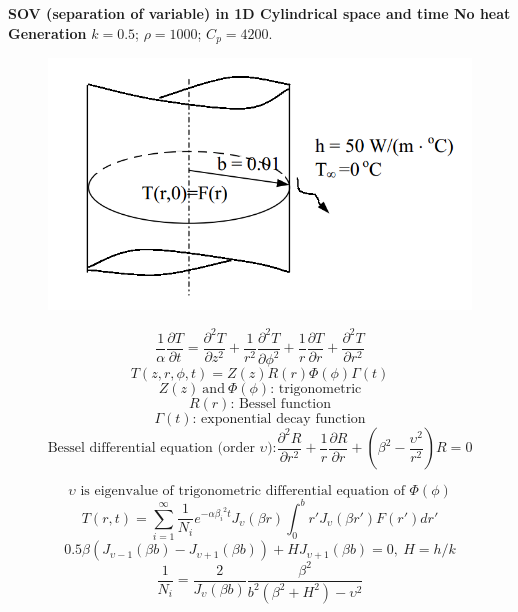 \begin{example}
\textbf{SOV (separation of variable) in 1D Cylindrical space and time
No heat Generation}
$k = 0.5$; $\rho= 1000$; $C_p = 4200$.
\begin{figure}[H]
  \centering
    \includegraphics[scale=0.5]{figures/appendixA/6}
\end{figure}
$$\frac{1}{\alpha}\frac{\partial T}{\partial t}=
\frac{\partial^2 T}{\partial z^2}+
\frac{1}{r^2}\frac{\partial^2 T}{\partial \phi^2}+
\frac{1}{r}\frac{\partial T}{\partial r}+
\frac{\partial^2 T}{\partial r^2}$$
$$T(z,r,\phi,t)=Z(z)R(r)\Phi(\phi)\Gamma(t)$$
$$Z(z)~\text{and} ~\Phi(\phi)\text{: trigonometric}$$
$$R(r)\text{: Bessel function}$$
$$\Gamma(t)\text{: exponential decay function}$$
$$\text{Bessel differential equation (order } \upsilon\text{):}
\frac{\partial^2 R}{\partial r^2}+
\frac{1}{r}\frac{\partial R}{\partial r}+
\left(\beta^2-\frac{\upsilon^2}{r^2}\right) R=0
$$

$$\upsilon \text{ is eigenvalue of trigonometric differential equation of } \Phi(\phi)$$
$$T(r,t)=\sum_{i=1}^{\infty} \frac{1}{N_i}e^{-\alpha{\beta_i}^2t}J_\upsilon(\beta r)\int_0^{b}r'J_\upsilon(\beta r')F(r')dr'$$
$$0.5\beta(J_{\upsilon-1}(\beta b)-
J_{\upsilon+1}(\beta b))+
HJ_{\upsilon+1}(\beta b)=0,
~H=h/k
$$
$$\frac{1}{N_i}=\frac{2}{J_\upsilon(\beta b)}
\frac{\beta^2}{b^2(\beta^2+H^2)-\upsilon^2}
$$
\end{example}

